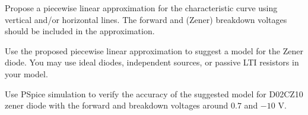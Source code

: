 \documentclass[11pt]{article}
\begin{document}
\begin{question}

    \begin{subquestion}{Propose a piecewise linear approximation for the characteristic curve using vertical and/or horizontal lines. The forward and (Zener) breakdown voltages should be included in the approximation. }

        \answer{}

    \end{subquestion}

    \begin{subquestion}{Use the proposed piecewise linear approximation to suggest a model for the Zener diode. You may use ideal diodes, independent sources, or passive LTI resistors in your model. }

        \answer{}

    \end{subquestion}

    \begin{subquestion}{Use PSpice simulation to verify the accuracy of the suggested model for D02CZ10 zener diode with the forward and breakdown voltages around $0.7$ and $-10$ V. }

        \answer{}

    \end{subquestion}

\end{question}




\begin{question}


\end{question}

\end{document}
